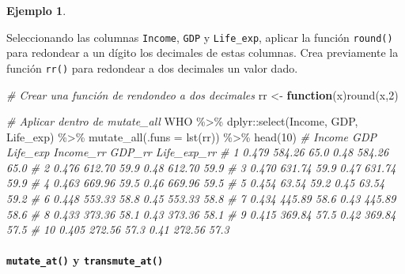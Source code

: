 \documentclass[
]{article}
\newenvironment{Shaded}{\begin{snugshade}}{\end{snugshade}}
\newcommand{\AttributeTok}[1]{\textcolor[rgb]{0.77,0.63,0.00}{#1}}
\newcommand{\CommentTok}[1]{\textcolor[rgb]{0.56,0.35,0.01}{\textit{#1}}}
\newcommand{\ControlFlowTok}[1]{\textcolor[rgb]{0.13,0.29,0.53}{\textbf{#1}}}
\newcommand{\DecValTok}[1]{\textcolor[rgb]{0.00,0.00,0.81}{#1}}
\newcommand{\FunctionTok}[1]{\textcolor[rgb]{0.00,0.00,0.00}{#1}}
\newcommand{\NormalTok}[1]{#1}
\newcommand{\OtherTok}[1]{\textcolor[rgb]{0.56,0.35,0.01}{#1}}
\newcommand{\SpecialCharTok}[1]{\textcolor[rgb]{0.00,0.00,0.00}{#1}}
\theoremstyle{definition}
\theoremstyle{definition}
\newtheorem{example}{Ejemplo}[section]
\theoremstyle{definition}
\theoremstyle{definition}
\theoremstyle{remark}
\begin{document}
\begin{example}
\protect\hypertarget{exm:mutateall}{}\label{exm:mutateall}

Seleccionando las columnas \texttt{Income}, \texttt{GDP} y \texttt{Life\_exp}, aplicar la función \texttt{round()} para redondear a un dígito los decimales de estas columnas. Crea previamente la función \texttt{rr()} para redondear a dos decimales un valor dado.

\begin{Shaded}
\begin{Highlighting}[]
\CommentTok{\# Crear una función de rendondeo a dos decimales}
\NormalTok{rr }\OtherTok{\textless{}{-}} \ControlFlowTok{function}\NormalTok{(x)}\FunctionTok{round}\NormalTok{(x,}\DecValTok{2}\NormalTok{)}

\CommentTok{\# Aplicar dentro de mutate\_all}
\NormalTok{WHO }\SpecialCharTok{\%\textgreater{}\%} 
\NormalTok{  dplyr}\SpecialCharTok{::}\FunctionTok{select}\NormalTok{(Income, GDP, Life\_exp) }\SpecialCharTok{\%\textgreater{}\%} 
  \FunctionTok{mutate\_all}\NormalTok{(}\AttributeTok{.funs =} \FunctionTok{lst}\NormalTok{(rr)) }\SpecialCharTok{\%\textgreater{}\%} 
  \FunctionTok{head}\NormalTok{(}\DecValTok{10}\NormalTok{)}
\CommentTok{\#    Income    GDP Life\_exp Income\_rr GDP\_rr Life\_exp\_rr}
\CommentTok{\# 1   0.479 584.26     65.0      0.48 584.26        65.0}
\CommentTok{\# 2   0.476 612.70     59.9      0.48 612.70        59.9}
\CommentTok{\# 3   0.470 631.74     59.9      0.47 631.74        59.9}
\CommentTok{\# 4   0.463 669.96     59.5      0.46 669.96        59.5}
\CommentTok{\# 5   0.454  63.54     59.2      0.45  63.54        59.2}
\CommentTok{\# 6   0.448 553.33     58.8      0.45 553.33        58.8}
\CommentTok{\# 7   0.434 445.89     58.6      0.43 445.89        58.6}
\CommentTok{\# 8   0.433 373.36     58.1      0.43 373.36        58.1}
\CommentTok{\# 9   0.415 369.84     57.5      0.42 369.84        57.5}
\CommentTok{\# 10  0.405 272.56     57.3      0.41 272.56        57.3}
\end{Highlighting}
\end{Shaded}

\end{example}

\hypertarget{mutate_at-y-transmute_at}{%
\paragraph{\texorpdfstring{\texttt{mutate\_at()} y \texttt{transmute\_at()}}{mutate\_at() y transmute\_at()}}\label{mutate_at-y-transmute_at}}
\end{document}
